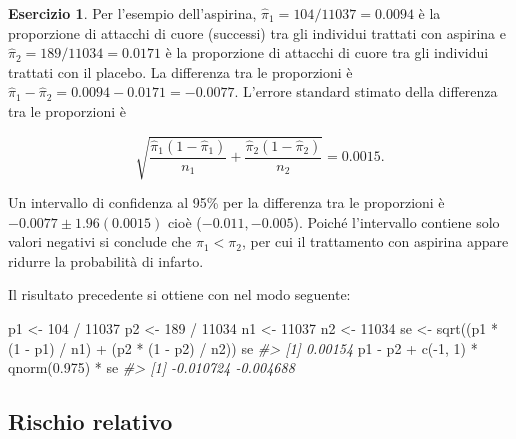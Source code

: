 \documentclass[
  11pt,
]{krantz}
\makeatletter
\newenvironment{Shaded}{\begin{snugshade}}{\end{snugshade}}
\newcommand{\CommentTok}[1]{\textcolor[rgb]{0.37,0.37,0.37}{\textit{#1}}}
\newcommand{\DecValTok}[1]{\textcolor[rgb]{0.06,0.06,0.06}{#1}}
\newcommand{\FloatTok}[1]{\textcolor[rgb]{0.06,0.06,0.06}{#1}}
\newcommand{\FunctionTok}[1]{\textcolor[rgb]{0,0,0}{#1}}
\newcommand{\NormalTok}[1]{#1}
\newcommand{\OtherTok}[1]{\textcolor[rgb]{0.37,0.37,0.37}{#1}}
\newcommand{\SpecialCharTok}[1]{\textcolor[rgb]{0,0,0}{#1}}
\newenvironment{kframe}{%
\medskip{}
\setlength{\fboxsep}{.8em}
 \def\at@end@of@kframe{}%
 \ifinner\ifhmode%
  \def\at@end@of@kframe{\end{minipage}}%
  \begin{minipage}{\columnwidth}%
 \fi\fi%
 \def\FrameCommand##1{\hskip\@totalleftmargin \hskip-\fboxsep
 \colorbox{shadecolor}{##1}\hskip-\fboxsep
     \hskip-\linewidth \hskip-\@totalleftmargin \hskip\columnwidth}%
 \MakeFramed {\advance\hsize-\width
   \@totalleftmargin\z@ \linewidth\hsize
   \@setminipage}}%
 {\par\unskip\endMakeFramed%
 \at@end@of@kframe}
\renewenvironment{Shaded}{\begin{kframe}}{\end{kframe}}
\theoremstyle{definition}
\theoremstyle{definition}
\theoremstyle{definition}
\newtheorem{exercise}{Esercizio}[chapter]
\theoremstyle{definition}
\theoremstyle{remark}
\makeatother
\begin{document}
\begin{exercise}

Per l'esempio dell'aspirina, \(\hat{\pi}_1=104/11037 = 0.0094\) è la proporzione di attacchi di cuore (successi) tra gli individui trattati con aspirina e \(\hat{\pi}_2=189/11034 = 0.0171\) è la proporzione di attacchi di cuore tra gli individui trattati con il placebo. La differenza tra le proporzioni è \(\hat{\pi}_1 - \hat{\pi}_2 = 0.0094 - 0.0171 = -0.0077\). L'errore standard stimato della differenza tra le proporzioni è

\[
\sqrt{\frac{\hat{\pi}_1(1-\hat{\pi}_1)}{n_1} +
\frac{\hat{\pi}_2(1-\hat{\pi}_2)}{n_2}} = 0.0015.
\]

Un intervallo di confidenza al 95\% per la differenza tra le proporzioni è \(-0.0077 \pm 1.96(0.0015)\) cioè (\(-0.011, -0.005\)). Poiché l'intervallo contiene solo valori negativi si conclude che \(\pi_1 < \pi_2\), per cui il trattamento con aspirina appare ridurre la probabilità di infarto.

Il risultato precedente si ottiene con nel modo seguente:

\begin{Shaded}
\begin{Highlighting}[]
\NormalTok{p1 }\OtherTok{\textless{}{-}} \DecValTok{104} \SpecialCharTok{/} \DecValTok{11037}
\NormalTok{p2 }\OtherTok{\textless{}{-}} \DecValTok{189} \SpecialCharTok{/} \DecValTok{11034}
\NormalTok{n1 }\OtherTok{\textless{}{-}} \DecValTok{11037}
\NormalTok{n2 }\OtherTok{\textless{}{-}} \DecValTok{11034}
\NormalTok{se }\OtherTok{\textless{}{-}} \FunctionTok{sqrt}\NormalTok{((p1 }\SpecialCharTok{*}\NormalTok{ (}\DecValTok{1} \SpecialCharTok{{-}}\NormalTok{ p1) }\SpecialCharTok{/}\NormalTok{ n1) }\SpecialCharTok{+}\NormalTok{ (p2 }\SpecialCharTok{*}\NormalTok{ (}\DecValTok{1} \SpecialCharTok{{-}}\NormalTok{ p2) }\SpecialCharTok{/}\NormalTok{ n2))}
\NormalTok{se}
\CommentTok{\#\textgreater{} [1] 0.00154}
\NormalTok{p1 }\SpecialCharTok{{-}}\NormalTok{ p2 }\SpecialCharTok{+} \FunctionTok{c}\NormalTok{(}\SpecialCharTok{{-}}\DecValTok{1}\NormalTok{, }\DecValTok{1}\NormalTok{) }\SpecialCharTok{*} \FunctionTok{qnorm}\NormalTok{(}\FloatTok{0.975}\NormalTok{) }\SpecialCharTok{*}\NormalTok{ se}
\CommentTok{\#\textgreater{} [1] {-}0.010724 {-}0.004688}
\end{Highlighting}
\end{Shaded}

\end{exercise}

\hypertarget{rischio-relativo}{%
\subsection{Rischio relativo}\label{rischio-relativo}}
\end{document}
